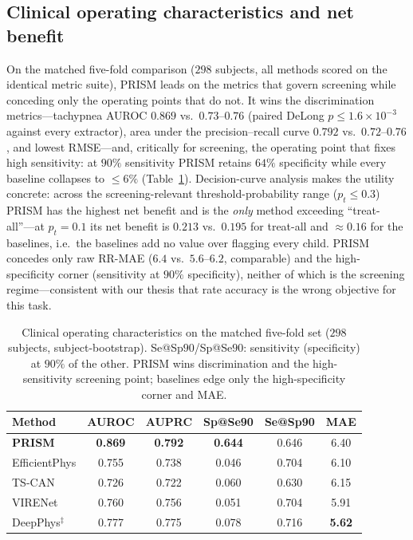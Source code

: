 \subsection{Clinical operating characteristics and net benefit}\label{sec:opchar}
On the matched five-fold comparison ($298$ subjects, all methods scored on the identical metric
suite), PRISM leads on the metrics that govern screening while conceding only the operating points
that do not. It wins the discrimination metrics---tachypnea AUROC $0.869$ vs.\ $0.73$--$0.76$ (paired
DeLong $p\le1.6\times10^{-3}$ against every extractor), area under the precision--recall curve
$0.792$ vs.\ $0.72$--$0.76$, and lowest RMSE---and, critically for screening, the operating point that
fixes high sensitivity: at $90\%$ sensitivity PRISM retains $64\%$ specificity while every baseline
collapses to $\le6\%$ (Table~\ref{tab:opchar}). Decision-curve analysis makes the utility concrete:
across the screening-relevant threshold-probability range ($p_t\le0.3$) PRISM has the highest net
benefit and is the \emph{only} method exceeding ``treat-all''---at $p_t{=}0.1$ its net benefit is
$0.213$ vs.\ $0.195$ for treat-all and $\approx0.16$ for the baselines, i.e.\ the baselines add no
value over flagging every child. PRISM concedes only raw RR-MAE ($6.4$ vs.\ $5.6$--$6.2$, comparable)
and the high-specificity corner (sensitivity at $90\%$ specificity), neither of which is the screening
regime---consistent with our thesis that rate accuracy is the wrong objective for this task.

\begin{table}[!t]\caption{Clinical operating characteristics on the matched five-fold set ($298$
subjects, subject-bootstrap). Se@Sp$90$/Sp@Se$90$: sensitivity (specificity) at $90\%$ of the other.
PRISM wins discrimination and the high-sensitivity screening point; baselines edge only the
high-specificity corner and MAE.}\label{tab:opchar}\centering\small
\begin{tabular}{@{}lccccc@{}}\toprule
Method & AUROC & AUPRC & Sp@Se90 & Se@Sp90 & MAE\\\midrule
\textbf{PRISM} & \textbf{0.869} & \textbf{0.792} & \textbf{0.644} & 0.646 & 6.40\\
EfficientPhys & 0.755 & 0.738 & 0.046 & 0.704 & 6.10\\
TS-CAN & 0.726 & 0.722 & 0.060 & 0.630 & 6.15\\
VIRENet & 0.760 & 0.756 & 0.051 & 0.704 & 5.91\\
DeepPhys$^\ddagger$ & 0.777 & 0.775 & 0.078 & 0.716 & \textbf{5.62}\\\bottomrule
\end{tabular}\end{table}

